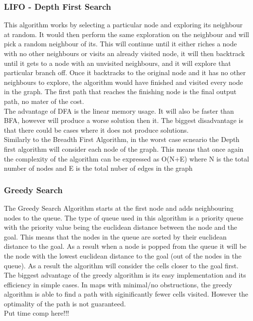 \documentclass[a4paper,12pt]{article}
\begin{document}
			\subsubsection{LIFO - Depth First Search}
			
				This algorithm works by selecting a particular node and exploring its neighbour at random. It 
				would then perform the same exploration on the neighbour and will pick a random neighbour of its. 
				This will continue until it either riches a node with no other neighbours or visits an already 
				visited node, it will then backtrack until it gets to a node with an unvisited neighbours, and 
				it will explore that particular branch off. Once it backtracks to the original node and it has 
				no other neighbours to explore, the algorithm would have finished and visited every node in the 
				graph. The first path that reaches the finishing node is the final output path, no mater of the 
				cost. 
				\\
				The advantage of DFA is the linear memory usage. It will also be faster than BFA, however will
				produce a worse solution then it.  The biggest disadvantage is that there could be cases where 
				it does not produce solutions. 
				\\
				Similarly to the Breadth First Algorithm, in the worst case scneario the Depth first algorithm
				will consider each node of the graph. This means that once again the complexity of the algorithm
				can be expressed as O(N+E) where N is the total number of nodes and E is the total nuber of edges
				in the graph
			
			\subsubsection{Greedy Search}
				The Greedy Search Algorithm starts at the first node and adds neighbouring nodes to the queue. The
				type of queue used in this algorithm is a priority queue with the priority value being the euclidean
				distance between the node and the goal. This means that the nodes in the queue are sorted by their
				euclidean distance to the goal. As a result when a node is popped from the queue it will be the node
				with the lowest euclidean distance to the goal (out of the nodes in the queue). As a result the algorithm
				will consider the cells closer to the goal first.
				\\
				The biggest advantage of the greedy algorithm is its easy implementation and its efficiency in simple
				cases. In maps with minimal/no obstructions, the greedy algorithm is able to find a path with siginificantly
				fewer cells visited. However the optimality of the path is not guaranteed.
				\\
				Put time comp here!!!
\end{document}
